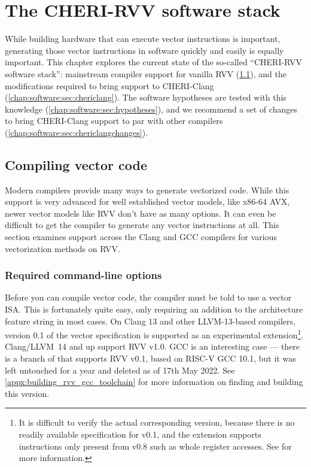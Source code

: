 \documentclass[../thesis]{subfiles}
\begin{document}
\chapter{The CHERI-RVV software stack\label{chap:software}}
While building hardware that can execute vector instructions is important, generating those vector instructions in software quickly and easily is equally important.
This chapter explores the current state of the so-called ``CHERI-RVV software stack'': mainstream compiler support for vanilla RVV (\cref{chap:software:sec:compilersupport}), and the modifications required to bring support to CHERI-Clang (\cref{chap:software:sec:chericlang}).
The software hypotheses are tested with this knowledge (\cref{chap:software:sec:hypotheses}), and we recommend a set of changes to bring CHERI-Clang support to par with other compilers (\cref{chap:software:sec:chericlangchanges}).

\section{Compiling vector code}\label{chap:software:sec:compilersupport}
Modern compilers provide many ways to generate vectorized code.
While this support is very advanced for well established vector models, like x86-64 AVX, newer vector models like RVV don't have as many options.
It can even be difficult to get the compiler to generate any vector instructions at all.
This section examines support across the Clang and GCC compilers for various vectorization methods on RVV.

\subsection{Required command-line options}
Before you can compile vector code, the compiler must be told to use a vector ISA.
This is fortunately quite easy, only requiring an addition to the architecture feature string in most cases.
On Clang 13 and other LLVM-13-based compilers, version 0.1 of the vector specification is supported as an experimental extension\footnote{It is difficult to verify the actual corresponding version, because there is no readily available specification for v0.1, and the extension supports instructions only present from v0.8 such as whole register accesses. See  for more information.}.
Clang/LLVM~14 and up support RVV v1.0.
GCC is an interesting case --- there is a branch of  that supports RVV v0.1, based on RISC-V GCC 10.1, but it was left untouched for a year and deleted as of 17th May 2022.
See \cref{appx:building_rvv_gcc_toolchain} for more information on finding and building this version.
\end{document}
